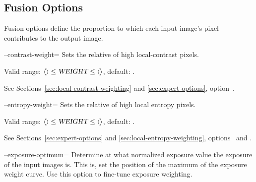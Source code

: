 

\subsection[Fusion Options]{Fusion Options
  \label{sec:fusion-options}
  }

Fusion options define the proportion to which each input image's pixel
contributes to the output image.

\begin{codelist}
  \label{opt:contrast-weight}%
\item[--contrast-weight=\metavar{WEIGHT}]\itemend Sets the relative
   of high local-contrast pixels.%

  Valid range: $\val{val:minimum-weight-contrast} \leq
  \metavar{WEIGHT} \leq \val{val:maximum-weight-contrast}$, default:
  .

  See Sections~\ref{sec:local-contrast-weighting} and
  \ref{sec:expert-options}, option~.


  \label{opt:entropy-weight}%
\item[--entropy-weight=\metavar{WEIGHT}]\itemend Sets the relative
   of high local entropy pixels.%

  Valid range: $\val{val:minimum-weight-entropy} \leq \metavar{WEIGHT}
  \leq \val{val:maximum-weight-entropy}$, default:
  .

  See Sections~\ref{sec:expert-options} and
  \ref{sec:local-entropy-weighting},
  options~ and
  .


  \label{opt:exposure-optimum}%
\item[--exposure-optimum=\metavar{OPTIMUM}]\itemend Determine at what
  normalized exposure value the  exposure of the
  input images is.  This is, set the position of the maximum of the
  exposure weight curve.  Use this option to fine-tune exposure
  weighting.


\end{codelist}
